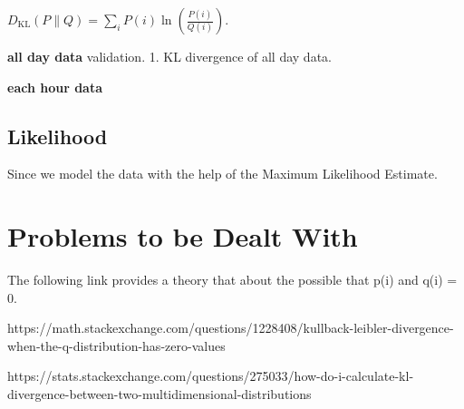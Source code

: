 \documentclass{article}
\begin{document}
$D_{\mathrm{KL}} ( P \mathop{\|} Q ) = \sum_i P(i) \ln \left( \frac{P(i)}{Q(i)} \right).$

\textbf{all day data}
validation. 1. KL divergence of all day data.

\textbf{each hour data}

\subsection{Likelihood}
Since we model the data with the help of the Maximum Likelihood Estimate.

\section{Problems to be Dealt With}
The following link provides a theory that about the possible that p(i) and q(i) = 0.

https://math.stackexchange.com/questions/1228408/kullback-leibler-divergence-when-the-q-distribution-has-zero-values

https://stats.stackexchange.com/questions/275033/how-do-i-calculate-kl-divergence-between-two-multidimensional-distributions

% 

\end{document}
